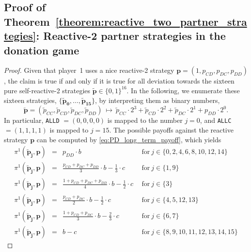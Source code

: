 \documentclass[9pt,twoside,lineno]{pnas-new}
\theoremstyle{plainCl1}
\theoremstyle{plainCl2}
\def\allc{\texttt{ALLC}}
\def\alld{\texttt{ALLD}}
\begin{document}
\subsection{Proof of Theorem~\ref{theorem:reactive_two_partner_strategies}: Reactive-2 partner strategies in the donation game}
\begin{proof}
Given that player~1 uses a nice reactive-2 strategy $\mathbf{p} = (1, p_{CD},p_{DC}, p_{DD})$, the claim is true if and only if it is true for all deviation towards the sixteen pure self-reactive-2 strategies $\mathbf{\tilde{p}}\!\in\!\{0,1\}^{16}$. 
In the following, we enumerate these sixteen strategies, $\{\mathbf{\tilde{p}_0}, \dots, \mathbf{\tilde{p}_{15}}\}$, 
by interpreting them as binary numbers, 
\begin{equation}
\mathbf{\tilde p} = (\tilde p_{CC}, \tilde p_{CD},\tilde p_{DC},\tilde p_{DD}) ~\mapsto~
\tilde p_{CC} \!\cdot\! 2^3 + \tilde p_{CD} \!\cdot\! 2^2 + \tilde p_{DC} \!\cdot\! 2^1 + p_{DD}\cdot 2^0. 
\end{equation}
In particular, \alld{} $=\!(0,0,0,0)$ is mapped to the number $j\!=\!0$, and \allc{} $=\!(1,1,1,1)$ is mapped to $j\!=\!15$. 
The possible payoffs against the reactive strategy $\mathbf{p}$ can be computed by \eqref{eq:PD_long_term_payoff}, which yields
\begin{equation*}\label{Eq:PayoffExpressionsReactiveTwo}
  \begin{array}{lcll}
   \pi^1(\mathbf{\tilde p_j},\mathbf{p}) &= &\displaystyle p_{DD}\cdot b & ~~\text{for}~ j\! \in\!  \{0, 2, 4, 6, 8, 10, 12, 14\} \\[0.3cm]
   \pi^1(\mathbf{\tilde p_j},\mathbf{p}) &= &\displaystyle  \frac{p_{CD} + p_{DC} + p_{DD}}{3}\cdot b - \frac{1}{3} \cdot c  & ~~\text{for}~ j\! \in\!  \{1, 9\} \\[0.3cm]
   \pi^1(\mathbf{\tilde p_j},\mathbf{p}) &= &\displaystyle  \frac{1+p_{CD} + p_{DC} + p_{DD} }{4}\cdot b - \frac{1}{2} \cdot c  & ~~\text{for}~ j\! \in\!  \{3\} \\[0.3cm]
   \pi^1(\mathbf{\tilde p_j},\mathbf{p}) &= &\displaystyle  \frac{p_{CD} + p_{DC}}{2}\cdot b - \frac{1}{2} \cdot c  & ~~\text{for}~ j\! \in\!  \{4, 5, 12, 13\} \\[0.3cm]
   \pi^1(\mathbf{\tilde p_j},\mathbf{p}) &= &\displaystyle  \frac{1+p_{CD} + p_{DC}}{3}\cdot b - \frac{2}{3} \cdot c  & ~~\text{for}~ j\! \in\!  \{6, 7\}\\[0.3cm]
   \pi^1(\mathbf{\tilde p_j},\mathbf{p}) &= &\displaystyle  b - c & ~~\text{for}~ j\! \in\!  \{8, 9, 10, 11, 12, 13, 14, 15\}

\end{array}
\end{equation*}
\end{proof}
\end{document}
